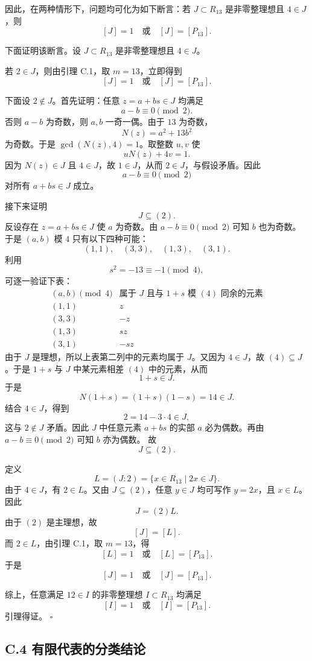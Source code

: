 因此，在两种情形下，问题均可化为如下断言：若 \(J\subset R_{13}\)
是非零整理想且 \(4\in J\)，则
\[
[J]=1\quad\text{或}\quad [J]=[P_{13}].
\]

下面证明该断言。设 \(J\subset R_{13}\) 是非零整理想且 \(4\in J\)。

若 \(2\in J\)，则由引理 C.1，取 \(m=13\)，立即得到
\[
[J]=1\quad\text{或}\quad [J]=[P_{13}].
\]

下面设 \(2\notin J\)。首先证明：任意
\(z=a+bs\in J\) 均满足
\[
a-b\equiv0\pmod2.
\]
否则 \(a-b\) 为奇数，则 \(a,b\) 一奇一偶。由于 \(13\) 为奇数，
\[
N(z)=a^2+13b^2
\]
为奇数。于是 \(\gcd(N(z),4)=1\)。取整数 \(u,v\) 使
\[
uN(z)+4v=1.
\]
因为 \(N(z)\in J\) 且 \(4\in J\)，故 \(1\in J\)，从而
\(2\in J\)，与假设矛盾。因此
\[
a-b\equiv0\pmod2
\]
对所有 \(a+bs\in J\) 成立。

接下来证明
\[
J\subseteq(2).
\]
反设存在 \(z=a+bs\in J\) 使 \(a\) 为奇数。由
\(a-b\equiv0\pmod2\) 可知 \(b\) 也为奇数。于是
\((a,b)\) 模 \(4\) 只有以下四种可能：
\[
(1,1),\quad (3,3),\quad (1,3),\quad (3,1).
\]
利用
\[
s^2=-13\equiv-1\pmod4,
\]
可逐一验证下表：
\[
\begin{array}{c|c}
(a,b)\pmod4 & \text{属于 }J\text{ 且与 }1+s\text{ 模 }(4)\text{ 同余的元素} \\
\hline
(1,1) & z \\
(3,3) & -z \\
(1,3) & sz \\
(3,1) & -sz
\end{array}
\]
由于 \(J\) 是理想，所以上表第二列中的元素均属于 \(J\)。又因为
\(4\in J\)，故 \((4)\subseteq J\)。于是 \(1+s\) 与 \(J\) 中某元素相差
\((4)\) 中的元素，从而
\[
1+s\in J.
\]
于是
\[
N(1+s)=(1+s)(1-s)=14\in J.
\]
结合 \(4\in J\)，得到
\[
2=14-3\cdot4\in J,
\]
这与 \(2\notin J\) 矛盾。因此 \(J\) 中任意元素 \(a+bs\) 的实部
\(a\) 必为偶数。再由 \(a-b\equiv0\pmod2\) 可知 \(b\) 亦为偶数。
故
\[
J\subseteq(2).
\]

定义
\[
L=(J:2)=\{x\in R_{13}\mid 2x\in J\}.
\]
由于 \(4\in J\)，有 \(2\in L\)。又由 \(J\subseteq(2)\)，任意
\(y\in J\) 均可写作 \(y=2x\)，且 \(x\in L\)。因此
\[
J=(2)L.
\]
由于 \((2)\) 是主理想，故
\[
[J]=[L].
\]
而 \(2\in L\)，由引理 C.1，取 \(m=13\)，得
\[
[L]=1\quad\text{或}\quad [L]=[P_{13}].
\]
于是
\[
[J]=1\quad\text{或}\quad [J]=[P_{13}].
\]

综上，任意满足 \(12\in I\) 的非零整理想 \(I\subset R_{13}\) 均满足
\[
[I]=1\quad\text{或}\quad [I]=[P_{13}].
\]
引理得证。 \(\square\)

\subsection*{C.4 有限代表的分类结论}

